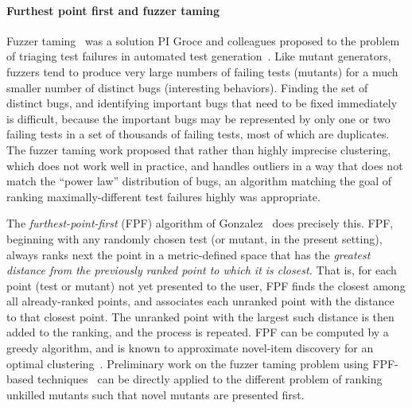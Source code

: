 \paragraph{Furthest point first and fuzzer taming} Fuzzer taming~\cite{PLDI13}
was a solution PI Groce and colleagues proposed to the problem
of triaging test failures in automated test generation~\cite{SemCrash}.
Like mutant generators, fuzzers tend to produce very large numbers of failing
tests (mutants) for a much
smaller number of distinct bugs (interesting behaviors).  Finding the set of distinct bugs,
and identifying important bugs that need to be fixed immediately is
difficult, because the important bugs may be represented by only one
or two failing tests in a set of thousands of failing tests, most of
which are duplicates.  The fuzzer taming work proposed that rather than highly imprecise
clustering, which does not work well in practice, and handles outliers
in a way that does not match the ``power law'' distribution of bugs, an
algorithm matching the goal of ranking maximally-different test
failures highly was appropriate.

The \emph{furthest-point-first} (FPF) algorithm of
Gonzalez~\cite{Gonzalez85} does precisely this.  FPF, beginning with
any randomly chosen test (or mutant, in the present setting), always ranks
next the point in a metric-defined space that has the \emph{greatest
  distance from the previously ranked point to which it is closest.}
That is, for each point (test or mutant) not yet presented to the
user, FPF finds the closest among all already-ranked points, and
associates each unranked point with the distance to that closest
point.  The unranked point with the largest such distance is then
added to the ranking, and the process is repeated.  FPF can be
computed by a greedy algorithm, and is known to approximate novel-item
discovery for an optimal clustering~\cite{Gonzalez85}.  Preliminary work on the fuzzer taming problem using FPF-based
techniques~\cite{PLDI13,distMut} can be directly applied
to the different problem of ranking
unkilled mutants such that novel mutants are presented first.  %

